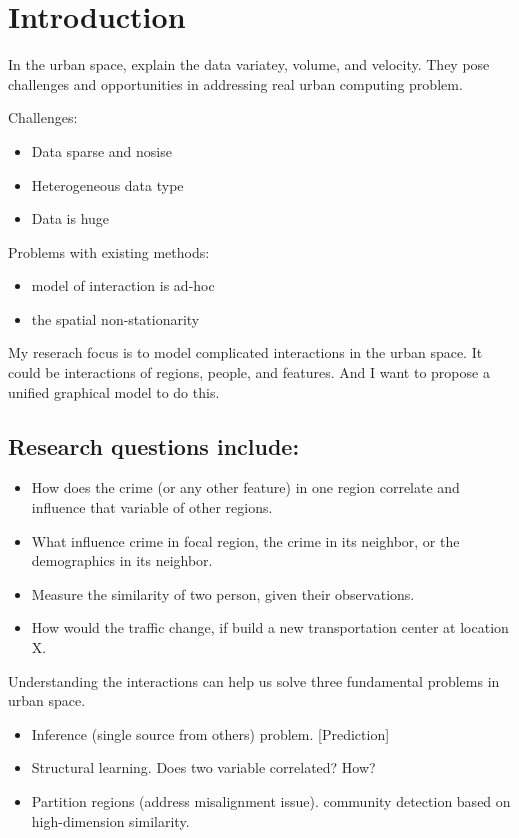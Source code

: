 \documentclass{article}
\begin{document}
\section{Introduction}

In the urban space, explain the data variatey, volume, and velocity. They pose challenges and opportunities in addressing real urban computing problem.

Challenges:
\begin{itemize}
\item Data sparse and nosise
\item Heterogeneous data type
\item Data is huge
\end{itemize}

Problems with existing methods:
\begin{itemize}
\item model of interaction is ad-hoc
\item the spatial non-stationarity
\end{itemize}


My reserach focus is to model complicated interactions in the urban space. It could be interactions of regions, people, and features. And I want to propose a unified graphical model to do this.

\subsection{Research questions include:}

\begin{itemize}
\item How does the crime (or any other feature) in one region correlate and influence that variable of other regions.
\item What influence crime in focal region, the crime in its neighbor, or the demographics in its neighbor.
\item Measure the similarity of two person, given their observations.
\item How would the traffic change, if build a new transportation center at location X.
\end{itemize}


Understanding the interactions can help us solve three fundamental problems in urban space.

\begin{itemize}
\item Inference (single source from others) problem. [Prediction]
\item Structural learning. Does two variable correlated? How?
\item Partition regions (address misalignment issue). community detection based on high-dimension similarity.
\end{itemize}
\end{document}

